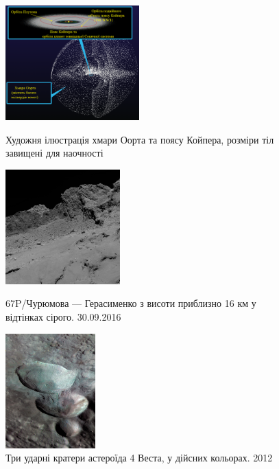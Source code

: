 \documentclass[a4paper]{article}
\begin{document}
    \begin{figure}[ht]
        \centering
        \vspace*{-2ex}
        \begin{minipage}[t]{0.336\textwidth}
            \includegraphics[height=167px]{Oort.png}
            \vspace*{-5ex}
            \caption{Художня ілюстрація хмари Оорта та поясу Койпера, розміри тіл завищені для наочності}
            \label{Oort}
        \end{minipage}
        \hfill
        \begin{minipage}[t]{0.307\textwidth}
            \includegraphics[height=167px]{surface.jpg}
            \vspace*{-5ex}
            \caption{67P/Чурюмова --- Герасименко з висоти приблизно 16 км у відтінках сірого. 30.09.2016\cite{12}}
            \label{surface}
        \end{minipage}
        \hfill
        \begin{minipage}[t]{0.27\textwidth}
            \includegraphics[height=167px]{Vesta_color.jpg}
            \vspace*{-5ex}
            \caption{Три ударні кратери астероїда 4 Веста, у дійсних кольорах. 2012\cite{13}}
        \end{minipage}
        \vspace*{-2ex}
    \end{figure}
    
\end{document}
